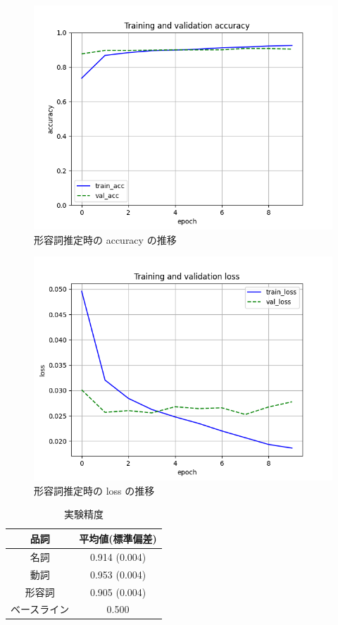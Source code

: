 \documentclass[twocolumn]{jarticle}
\begin{document}
\begin{figure}[tbp]
      \includegraphics[width=\linewidth]{keiyoushi_acc.png}
      \caption{形容詞推定時の accuracy の推移}
      \label{fig:kei_acc}
\end{figure}
\begin{figure}[tbp]
      \includegraphics[width=\linewidth]{keiyoushi_loss.png}
      \caption{形容詞推定時の loss の推移}
      \label{fig:kei_loss}
\end{figure}



\begin{table}[t]
	\caption{実験精度}
	\begin{tabular}{| c |  c |} \hline
  品詞 & 平均値(標準偏差)  \\ \hline \hline
  名詞 & 0.914 (0.004) \\ %
  動詞 & 0.953 (0.004) \\
  形容詞 & 0.905 (0.004) \\
  ベースライン & 0.500 \\ \hline
	\end{tabular}
	\label{tb:2}
\end{table}
\end{document}
